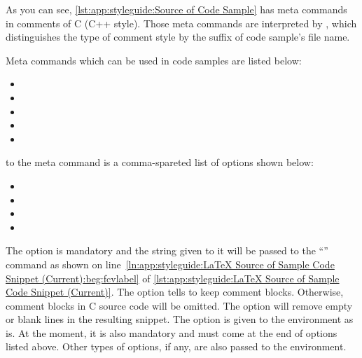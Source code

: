 As you can see, \cref{lst:app:styleguide:Source of Code Sample}
has meta commands in comments of C (C++ style). Those meta commands
are interpreted by , which distinguishes
the type of comment style by the suffix of code sample's file name.

Meta commands which can be used in code samples are listed below:

\begin{itemize}[noitemsep]
\item {}
\item {}
\item {}
\item \co{\\fcvexclude}
\item \co{\\fcvblank}
\end{itemize}

 to the  meta command
is a comma-spareted list of options shown below:

\begin{itemize}[noitemsep]
\item {}
\item {}
\item {}
\item {}
\end{itemize}

The  option is mandatory and the string given to it
will be passed to the
``'' command as shown on
line~\ref{ln:app:styleguide:LaTeX Source of Sample Code Snippet (Current):beg:fcvlabel} of
\cref{lst:app:styleguide:LaTeX Source of Sample Code Snippet (Current)}.
The  option tells  to keep
comment blocks.
Otherwise, comment blocks in C source code will be omitted.
The  option will remove empty or blank lines
in the resulting snippet.
The  option is given to the  environment
as is. At the moment, it is also mandatory
and must come at the end of options listed above.
Other types of options, if any, are also passed to the 
environment.

